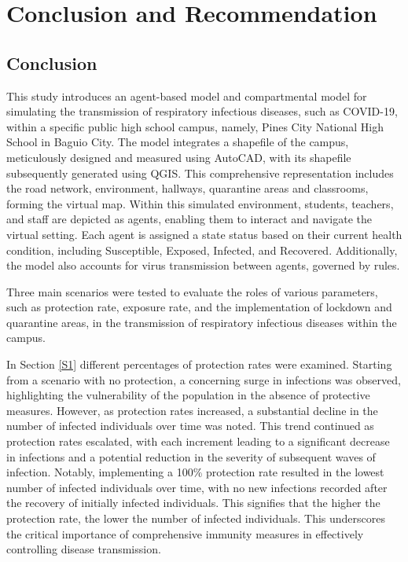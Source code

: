 \chapter{Conclusion and Recommendation}
\label{chap:Conclusion and Recommendation}



\section{Conclusion}
\indent \indent This study introduces an agent-based model and compartmental model for simulating the transmission of respiratory infectious diseases, such as COVID-19, within a specific public high school campus, namely, Pines City National High School in Baguio City. The model integrates a shapefile of the campus, meticulously designed and measured using AutoCAD, with its shapefile subsequently generated using QGIS. This comprehensive representation includes the road network, environment, hallways, quarantine areas and classrooms, forming the virtual map. Within this simulated environment, students, teachers, and staff are depicted as agents, enabling them to interact and navigate the virtual setting. Each agent is assigned a state status based on their current health condition, including Susceptible, Exposed, Infected, and Recovered. Additionally, the model also accounts for virus transmission between agents, governed by rules. 

\indent \indent Three main scenarios were tested to evaluate the roles of various parameters, such as protection rate, exposure rate, and the implementation of lockdown and quarantine areas, in the transmission of respiratory infectious diseases within the campus. 

In Section \ref{S1} different percentages of protection rates were examined. Starting from a scenario with no protection, a concerning surge in infections was observed, highlighting the vulnerability of the population in the absence of protective measures. However, as protection rates increased, a substantial decline in the number of infected individuals over time was noted. This trend continued as protection rates escalated, with each increment leading to a significant decrease in infections and a potential reduction in the severity of subsequent waves of infection. Notably, implementing a 100\% protection rate resulted in the lowest number of infected individuals over time, with no new infections recorded after the recovery of initially infected individuals. This signifies that the higher the protection rate, the lower the number of infected individuals.  This underscores the critical importance of comprehensive immunity measures in effectively controlling disease transmission.


